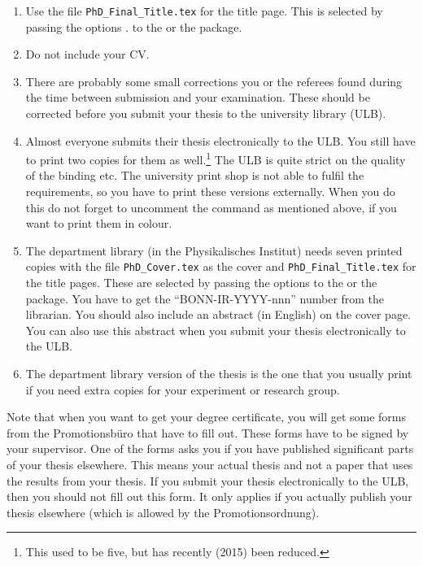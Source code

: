 \begin{enumerate}
\item Use the file \texttt{PhD\_Final\_Title.tex} for the title page.
  This is selected by passing the options .
  to the  or the  package.
\item Do not include your CV.
\item There are probably some small corrections you or the referees
  found during the time between submission and your examination. These
  should be corrected before you submit your thesis to the university
  library (ULB).
\item Almost everyone submits their thesis electronically to the
  ULB. You still have to print two copies for them as well.\footnote{%
  This used to be five, but has recently (2015) been reduced.}
  The ULB is quite strict on the quality of the binding etc. The university
  print shop is not able to fulfil the requirements, so you have to print
  these versions externally. When you do this do not forget to
  uncomment the  command as mentioned above, if you
  want to print them in colour.
\item The department
  library (in the Physikalisches
  Institut) needs seven printed copies with the file
  \texttt{PhD\_Cover.tex} as the cover and
  \texttt{PhD\_Final\_Title.tex} for the title pages.
  These are selected by passing the options 
  to the  or the  package.
  You have to get
  the \enquote{BONN-IR-YYYY-nnn} number from the librarian. You
  should also include an abstract (in English) on the cover page. You
  can also use this abstract when you submit your thesis
  electronically to the ULB.
\item The department library version of the thesis is the one that you usually print if
  you need extra copies for your experiment or research group.
\end{enumerate}

Note that when you want to get your degree certificate, you will get
some forms from the \foreignlanguage{ngerman}{Promotionsbüro} that have
to fill out. These forms have to be signed by your supervisor. One of
the forms asks you if you have published significant parts of your
thesis elsewhere. This means your actual thesis and not a paper that
uses the results from your thesis. If you submit your thesis
electronically to the ULB, then you should not fill out this form. It
only applies if you actually publish your thesis elsewhere (which is
allowed by the \foreignlanguage{ngerman}{Promotionsordnung}).

